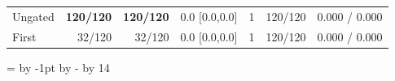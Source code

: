 \begin{table}[!htbp]
{\begin{tabular}{lrrrrrr}
Ungated & \cellcolor{ebCoral!35}\textbf{120/120} & \cellcolor{ebCoral!35}\textbf{120/120} & 0.0 \textcolor{black!60}{[0.0,0.0]} & 1 & 120/120 & 0.000 / 0.000 \\
First & 32/120 & 32/120 & 0.0 \textcolor{black!60}{[0.0,0.0]} & 1 & 120/120 & 0.000 / 0.000 \\
\bottomrule
\end{tabular}}
\setlength{\tabcolsep}{0pt}
=\linewidth\advance{} by -1pt\advance{} by -\divide{} by 14
\ifdim\dimen0<1.5pt \dimen0=1.5pt\fi
\setlength{\tabcolsep}{\dimen0}\familytab
\end{table}
